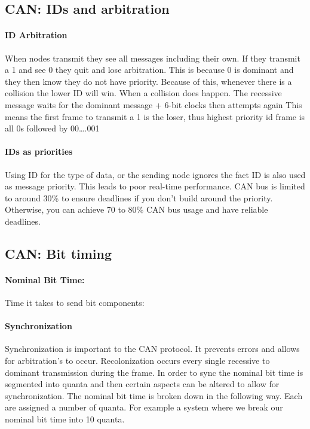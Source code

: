 \subsection{CAN: IDs and arbitration}
\paragraph{ID Arbitration} When nodes transmit they see all messages including their own. If they transmit a 1 and see 0 they quit and lose arbitration. This is because 0 is dominant and they then know they do not have priority. Because of this, whenever there is a collision the lower ID will win. When a collision does happen.
The recessive message waits for the dominant message + 6-bit clocks then
attempts again
This means the first frame to transmit a 1 is the loser, thus highest
priority id frame is all 0s followed by 00\ldots.001
\paragraph{IDs as priorities}
Using ID for the type of data, or the sending node ignores the fact ID is
also used as message priority. This leads to poor real-time performance.
CAN bus is limited to around 30\% to ensure deadlines if you don't build
around the priority. Otherwise, you can achieve 70 to 80\% CAN bus usage and
have reliable deadlines.

\subsection{CAN: Bit timing}
\paragraph{Nominal Bit Time:} Time it takes to send bit components:\\

\paragraph{Synchronization} Synchronization is important to the CAN protocol. It prevents errors and allows for arbitration's to occur. Recolonization occurs every single recessive to dominant transmission during the frame. In order to sync the nominal bit time is segmented into quanta and then certain aspects can be altered to allow for synchronization. 
The nominal bit time is broken down in the following way. Each are assigned a number of quanta. For example a system where we break our nominal bit time into 10 quanta.


